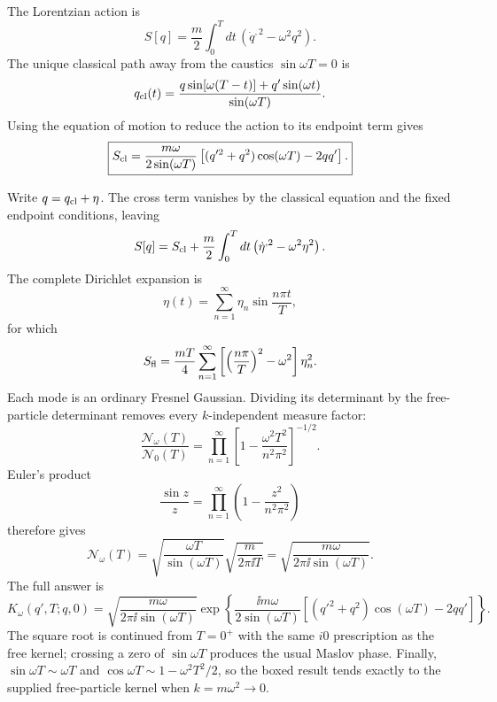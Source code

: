 \begin{enumerate}
The Lorentzian action is
\[
 S[q]=\frac m2\int_0^Tdt\,
 \left(\dot q^{,2}-\omega^2q^2\right).
\]
The unique classical path away from the caustics
\(\sin\omega T=0\) is
\[
 q_{\rm cl}(t)=
 \frac{q\sin[\omega(T-t)]+q'\sin(\omega t)}{\sin(\omega T)}.
\]
Using the equation of motion to reduce the action to its endpoint term
gives
\[
 \boxed{
 S_{\rm cl}=
 \frac{m\omega}{2\sin(\omega T)}
 \left[(q'^2+q^2)\cos(\omega T)-2qq'\right].}
\]

Write \(q=q_{\rm cl}+\eta\).  The cross term vanishes by the classical
equation and the fixed endpoint conditions, leaving
\[
 S[q]=S_{\rm cl}
 +\frac m2\int_0^Tdt\left(\dot\eta^{,2}-\omega^2\eta^2\right).
\]
The complete Dirichlet expansion is
\[
 \eta(t)=\sum_{n=1}^{\infty}\eta_n
 \sin\frac{n\pi t}{T},
\]
for which
\[
 S_{\rm fl}
 =\frac{mT}{4}\sum_{n=1}^{\infty}
 \left[\left(\frac{n\pi}{T}\right)^2-\omega^2\right]\eta_n^2.
\]
Each mode is an ordinary Fresnel Gaussian.  Dividing its determinant by
the free-particle determinant removes every \(k\)-independent measure
factor:
\[
 \frac{\mathcal N_\omega(T)}{\mathcal N_0(T)}
 =\prod_{n=1}^{\infty}
 \left[1-\frac{\omega^2T^2}{n^2\pi^2}\right]^{-1/2}.
\]
Euler's product
\[
 \frac{\sin z}{z}
 =\prod_{n=1}^{\infty}\left(1-\frac{z^2}{n^2\pi^2}\right)
\]
therefore gives
\[
 \mathcal N_\omega(T)
 =\sqrt{\frac{\omega T}{\sin(\omega T)}}
 \sqrt{\frac{m}{2\pi \ii T}}
 =\sqrt{\frac{m\omega}{2\pi \ii\sin(\omega T)}}.
\]
The full answer is
\[
 \boxed{
 K_\omega(q',T;q,0)
 =\sqrt{\frac{m\omega}{2\pi \ii\sin(\omega T)}}
 \exp\left\{
 \frac{\ii m\omega}{2\sin(\omega T)}
 \left[(q'^2+q^2)\cos(\omega T)-2qq'\right]
 \right\}.}
\]
The square root is continued from \(T=0^+\) with the same \(i0\)
prescription as the free kernel; crossing a zero of \(\sin\omega T\)
produces the usual Maslov phase.  Finally,
\(\sin\omega T\sim\omega T\) and
\(\cos\omega T\sim1-\omega^2T^2/2\), so the boxed result tends exactly to
the supplied free-particle kernel when \(k=m\omega^2\to0\).


\end{enumerate}
